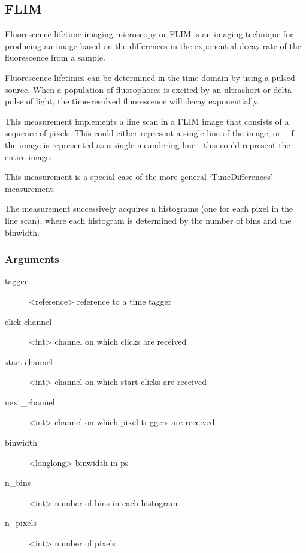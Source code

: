 \documentclass[letterpaper,10pt,english]{sphinxmanual}
\begin{document}
\subsection{FLIM}
\label{sections/api:flim}
Fluorescence-lifetime imaging microscopy or FLIM is an imaging technique
for producing an image based on the differences in the exponential decay rate
of the fluorescence from a sample.

Fluorescence lifetimes can be determined in the time domain by using a pulsed source. When a population
of fluorophores is excited by an ultrashort or delta pulse of light, the time-resolved fluorescence will
decay exponentially.

This measurement implements a line scan in a FLIM image that
consists of a sequence of pixels. This could either represent a single line
of the image, or - if the image is represented as a single meandering line -
this could represent the entire image.

This measurement is a special case of the more general `TimeDifferences' measurement.

The measurement successively acquires n histograms
(one for each pixel in the line scan), where each histogram
is determined by the number of bins and the binwidth.


\subsubsection{Arguments}
\label{sections/api:id8}\begin{description}
\item[{tagger}] \leavevmode
\textless{}reference\textgreater{} reference to a time tagger

\item[{click channel}] \leavevmode
\textless{}int\textgreater{} channel on which clicks are received

\item[{start channel}] \leavevmode
\textless{}int\textgreater{} channel on which start clicks are received

\item[{next\_channel}] \leavevmode
\textless{}int\textgreater{} channel on which pixel triggers are received

\item[{binwidth}] \leavevmode
\textless{}longlong\textgreater{} binwidth in ps

\item[{n\_bins}] \leavevmode
\textless{}int\textgreater{} number of bins in each histogram

\item[{n\_pixels}] \leavevmode
\textless{}int\textgreater{} number of pixels

\end{description}
\end{document}

